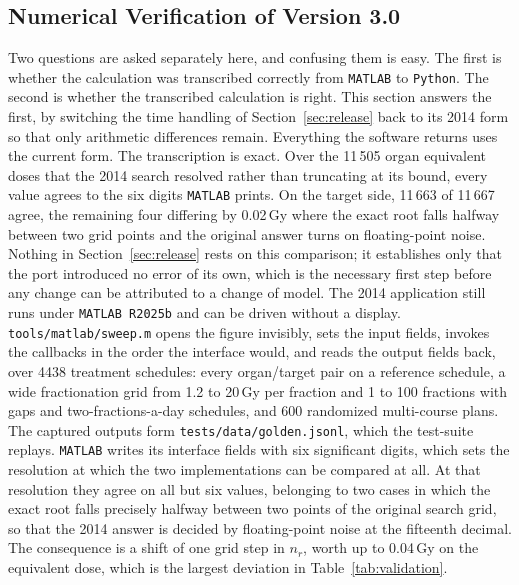 \documentclass[preprint,12pt,number]{elsarticle}
\begin{document}
\subsection{Numerical Verification of Version 3.0} \label{sec:verification}
Two questions are asked separately here, and confusing them is easy. The first is whether the calculation was transcribed correctly from \texttt{MATLAB} to \texttt{Python}. The second is whether the transcribed calculation is right. This section answers the first, by switching the time handling of Section~\ref{sec:release} back to its 2014 form so that only arithmetic differences remain. Everything the software returns uses the current form. The transcription is exact. Over the 11\,505 organ equivalent doses that the 2014 search resolved rather than truncating at its bound, every value agrees to the six digits \texttt{MATLAB} prints. On the target side, 11\,663 of 11\,667 agree, the remaining four differing by 0.02\,Gy where the exact root falls halfway between two grid points and the original answer turns on floating-point noise. Nothing in Section~\ref{sec:release} rests on this comparison; it establishes only that the port introduced no error of its own, which is the necessary first step before any change can be attributed to a change of model. The 2014 application still runs under \texttt{MATLAB R2025b} and can be driven without a display. \texttt{tools/matlab/sweep.m} opens the figure invisibly, sets the input fields, invokes the callbacks in the order the interface would, and reads the output fields back, over 4438 treatment schedules: every organ/target pair on a reference schedule, a wide fractionation grid from 1.2 to 20\,Gy per fraction and 1 to 100 fractions with gaps and two-fractions-a-day schedules, and 600 randomized multi-course plans. The captured outputs form \texttt{tests/data/golden.jsonl}, which the test-suite replays. \texttt{MATLAB} writes its interface fields with six significant digits, which sets the resolution at which the two implementations can be compared at all. At that resolution they agree on all but six values, belonging to two cases in which the exact root falls precisely halfway between two points of the original search grid, so that the 2014 answer is decided by floating-point noise at the fifteenth decimal. The consequence is a shift of one grid step in $n_r$, worth up to 0.04\,Gy on the equivalent dose, which is the largest deviation in Table~\ref{tab:validation}.
\end{document}
